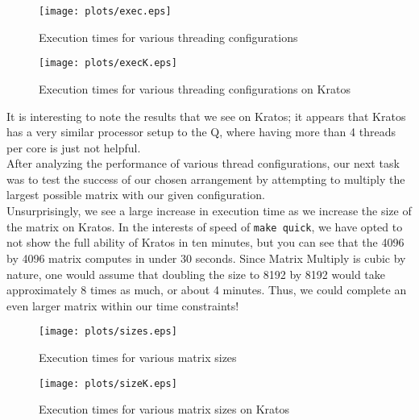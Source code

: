 \documentclass[twocolumn]{article}
\begin{document}
\begin{figure}[!ht]
  \centering
  \texttt{[image: plots/exec.eps]}
  \caption{Execution times for various threading configurations} \label{fig:exec}
\end{figure}

\begin{figure}[!ht]
  \centering
  \texttt{[image: plots/execK.eps]}
  \caption{Execution times for various threading configurations on Kratos} 
\end{figure}

It is interesting to note the results that we see on Kratos; it appears that Kratos
has a very similar processor setup to the Q, where having more than 4 threads per
core is just not helpful. \\

After analyzing the performance of various thread configurations, our next task
was to test the success of our chosen arrangement by attempting to multiply the
largest possible matrix with our given configuration. \\

Unsurprisingly, we see a large increase in execution time as we increase the size
of the matrix on Kratos. In the interests of speed of \texttt{make quick}, we have
opted to not show the full ability of Kratos in ten minutes, but you can see that the
4096 by 4096 matrix computes in under 30 seconds. Since Matrix Multiply is cubic by
nature, one would assume that doubling the size to 8192 by 8192 would take 
approximately 8 times as much, or about 4 minutes. Thus, we could complete an even
larger matrix within our time constraints!

\begin{figure}
  \texttt{[image: plots/sizes.eps]}
  \caption{Execution times for various matrix sizes} \label{fig:time}
\end{figure}

\begin{figure}
  \texttt{[image: plots/sizeK.eps]}
  \caption{Execution times for various matrix sizes on Kratos}
\end{figure}
\end{document}
